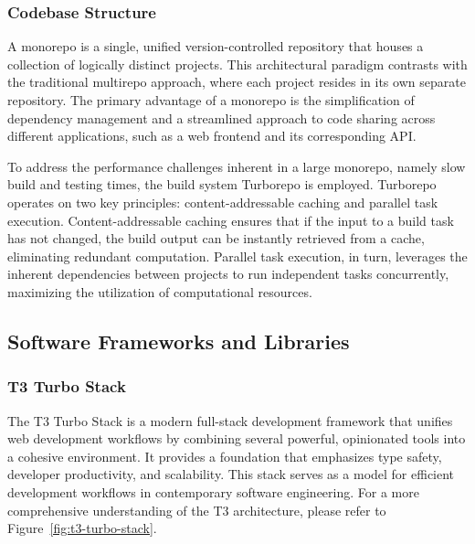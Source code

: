 \subsubsection{Codebase Structure}

A monorepo \cite{fernandez2024monorepo} is a single, unified version-controlled repository that houses a collection of logically distinct projects. This architectural paradigm contrasts with the traditional multirepo approach, where each project resides in its own separate repository. The primary advantage of a monorepo is the simplification of dependency management and a streamlined approach to code sharing across different applications, such as a web frontend and its corresponding API.

To address the performance challenges inherent in a large monorepo, namely slow build and testing times, the build system Turborepo \cite{turborepo2025intro} is employed. Turborepo operates on two key principles: content-addressable caching and parallel task execution. Content-addressable caching ensures that if the input to a build task has not changed, the build output can be instantly retrieved from a cache, eliminating redundant computation. Parallel task execution, in turn, leverages the inherent dependencies between projects to run independent tasks concurrently, maximizing the utilization of computational resources.

\subsection{Software Frameworks and Libraries}
\subsubsection{T3 Turbo Stack}
The T3 Turbo Stack \cite{t3app2025intro} is a modern full-stack development framework that unifies web development workflows by combining several powerful, opinionated tools into a cohesive environment. It provides a foundation that emphasizes type safety, developer productivity, and scalability. This stack serves as a model for efficient development workflows in contemporary software engineering. For a more comprehensive understanding of the T3 architecture, please refer to Figure~\ref{fig:t3-turbo-stack}.

